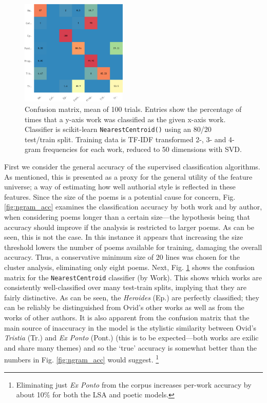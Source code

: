 \documentclass[twocolumn, switch, a4paper]{article} %
\begin{document}
\begin{figure}
\caption{
  Confusion matrix, mean of 100 trials. Entries show the percentage of times
that a y-axis work was classified as the given x-axis work. Classifier is
scikit-learn \texttt{NearestCentroid()} using an 80/20 test/train split.
Training data is TF-IDF transformed 2-, 3- and 4-gram frequencies for each
work, reduced to 50 dimensions with SVD. }
\label{fig:cm_ngrams}
\includegraphics[width=0.45\textwidth]{figures/cm_ngrams-crop.pdf}
\end{figure}

First we consider the general accuracy of the supervised classification
algorithms. As mentioned, this is presented as a proxy for the general utility
of the feature universe; a way of estimating how well authorial style is
reflected in these features. Since the size of the poems is a potential cause
for concern, Fig. \ref{fig:ngram_acc} examines the classification accuracy by
both work and by author, when considering poems longer than a certain
size---the hypothesis being that accuracy should improve if the analysis is
restricted to larger poems. As can be seen, this is not the case. In this
instance it appears that increasing the size threshold lowers the number of
poems available for training, damaging the overall accuracy. Thus, a
conservative minimum size of 20 lines was chosen for the cluster analysis,
eliminating only eight poems. Next, Fig. \ref{fig:cm_ngrams} shows the
confusion matrix for the \texttt{NearestCentroid} classifier (by Work). This
shows which works are consistently well-classified over many test-train
splits, implying that they are fairly distinctive. As can be seen, the
\emph{Heroides} (Ep.) are perfectly classified; they can be reliably be
distinguished from Ovid's other works as well as from the works of other
authors. It is also apparent from the confusion matrix that the main source of
inaccuracy in the model is the stylistic similarity between Ovid's
\emph{Tristia} (Tr.) and \emph{Ex Ponto} (Pont.) (this is to be
expected---both works are exilic and share many themes) and so the `true'
accuracy is somewhat better than the numbers in Fig. \ref{fig:ngram_acc} would
suggest.%
%
    \footnote{Eliminating just \emph{Ex Ponto} from the corpus increases
    per-work accuracy by about 10\% for both the LSA and poetic models.}
%
\end{document}
